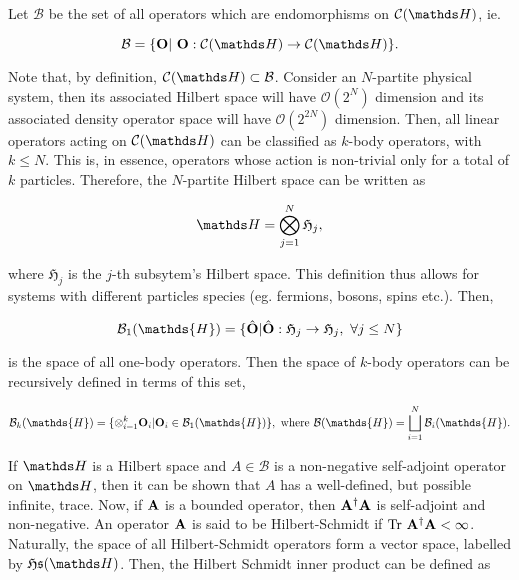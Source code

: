 \documentclass{homework}
\begin{document}
Let $\mathcal{B}$ be the set of all operators which are endomorphisms on $\statespace$, ie. 

$$
\mathcal{B} = \{{\bf O} | \blanky {\bf O}: \statespace \rightarrow \statespace\}.
$$

Note that, by definition, $\statespace \subset \mathcal{B}$. Consider an $N$-partite physical system, then its associated Hilbert space will have $\mathcal{O}(2^N)$ dimension and its associated density operator space will have $\mathcal{O}(2^{2N})$ dimension. Then, all linear operators acting on $\statespace$ can be classified as $k$-body operators, with $k \leq N$. This is, in essence, operators whose action is non-trivial only for a total of $k$ particles. Therefore, the $N$-partite Hilbert space can be written as 

$$
    \hilbert = \bigotimes_{j=1}^{N} \mathfrak{H}_j,
$$ 

where $\mathfrak{H}_j$ is the $j$-th subsytem's Hilbert space. This definition thus allows for systems with different particles species (eg. fermions, bosons, spins etc.). Then, 

$$
\mathcal{B}_1(\mathds{H})=\{\hat{\bf O}| \hat{\bf O}:\mathfrak{H}_j \rightarrow \mathfrak{H}_j, \blanky \forall j \leq N \}
$$ 

is the space of all one-body operators. Then the
space of $k$-body operators can be recursively defined in terms of this set, 

\begin{align*}
\mathcal{B}_k(\mathds{H}) = \{\otimes_{i=1}^{k} {\bf O}_i | {\bf O}_i \in \mathcal{B}_1(\mathds{H}) \}, \textnormal{ where } \mathcal{B}(\mathds{H}) = \bigsqcup_{i=1}^{N} \mathcal{B}_i(\mathds{H}).
\end{align*}


If $\hilbert$ is a Hilbert space and $A \in \mathcal{B}$ is a non-negative self-adjoint operator on $\hilbert$, then it can be shown that $A$ has a well-defined, but possible infinite, trace. Now, if ${\bf A}$ is a bounded operator, then ${\bf A}^\dagger {\bf A}$ is self-adjoint and non-negative. An operator ${\bf A}$ is said to be Hilbert-Schmidt if $\textnormal{Tr } \bf A^\dagger {\bf A} < \infty$. Naturally, the space of all Hilbert-Schmidt operators form a vector space, labelled by $\mathfrak{H}\mathfrak{s}(\hilbert)$. Then, the Hilbert Schmidt inner product can be defined as 
\end{document}
